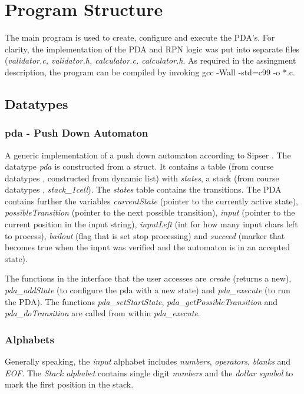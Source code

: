 \documentclass[a4paper,11pt,twoside]{article}
\begin{document}
\section{Program Structure}
The main program is used to create, configure and execute the
PDA's. For clarity, the implementation of the PDA and RPN logic was put
into separate files (\textit{validator.c, validator.h, calculator.c,
  calculator.h}. As required in the assingment description, the
program can be compiled by invoking gcc -Wall -std=c99 -o *.c.

\subsection{Datatypes}

\subsubsection{pda - Push Down Automaton}
A generic implementation of a push down automaton according to Sipser \cite[pp.112-125]{sipser2012}.
The datatype \textit{pda} is constructed from a struct. It contains a
table (from course datatypes \cite{datatypes}, constructed from
dynamic list) with \textit{states}, a stack (from course datatypes
\cite{datatypes}, \textit{stack\_1cell}). The \textit{states} table contains
the transitions. The PDA contains further the variables
\textit{currentState} (pointer to the currently active state),
\textit{possibleTransition} (pointer to the next possible transition),
\textit{input} (pointer to the current position in the input string), 
\textit{inputLeft} (int for how many input chars left to process),
\textit{bailout} (flag that is set stop processing) and
\textit{succeed} (marker that becomes true when the input was verified
and the automaton is in an accepted state).

The functions in the interface that the user accesses are \textit{create}
(returns a new), \textit{pda\_addState} (to configure the
pda with a new state) and \textit{pda\_execute} (to run the PDA). The
functions \textit{pda\_setStartState},
\textit{pda\_getPossibleTransition} and \textit{pda\_doTransition} are
called from within \textit{pda\_execute}. 


\subsubsection{Alphabets}
Generally speaking, the \textit{input} alphabet includes
\textit{numbers}, \textit{operators}, \textit{blanks} and
\textit{EOF}. The \textit{Stack alphabet} contains single digit
\textit{numbers} and the \textit{dollar symbol} to mark the first
position in the stack.   
\end{document}
